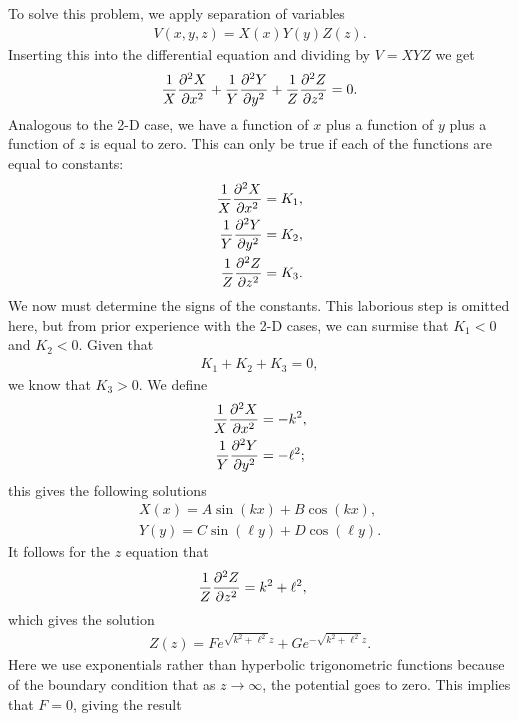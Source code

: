 To solve this problem, we apply separation of variables
\begin{align}
  V(x,y,z) = X(x) Y(y) Z(z) .
\end{align}
Inserting this into the differential equation and dividing by $V = XYZ$ we get
\begin{align}
  \frac{1}{X} \frac{ \partial^2 {X} }{ \partial {x}^2 } + \frac{1}{Y} \frac{ \partial^2 {Y} }{ \partial {y}^2 } + \frac{1}{Z} \frac{ \partial^2 {Z} }{ \partial {z}^2 } = 0.
\end{align}
Analogous to the 2-D case, we have a function of $x$ plus a function of $y$ plus a function of $z$ is equal to zero. This can only be true if each of the functions are equal to constants:
\begin{subequations}
\begin{align}
  \frac{1}{X} \frac{ \partial^2 {X} }{ \partial {x}^2 } &= K_1, \\
  \frac{1}{Y} \frac{ \partial^2 {Y} }{ \partial {y}^2 } &= K_2, \\
  \frac{1}{Z} \frac{ \partial^2 {Z} }{ \partial {z}^2 } &= K_3.  
\end{align}
\end{subequations}
We now must determine the signs of the constants. This laborious step is omitted here, but from prior experience with the 2-D cases, we can surmise that $K_1 < 0$ and $K_2 < 0$. Given that
\begin{align}
  K_1 + K_2 + K_3 = 0, \nonumber
\end{align}
we know that $K_3 > 0$. We define
\begin{subequations}
\begin{align}
  \frac{1}{X} \frac{ \partial^2 {X} }{ \partial {x}^2 } &= -k^2, \\
  \frac{1}{Y} \frac{ \partial^2 {Y} }{ \partial {y}^2 } &= -\ell^2 ; 
\end{align}
\end{subequations}
this gives the following solutions
\begin{subequations}
\begin{align}
  X(x) = A \sin( k x ) + B \cos ( k x ), \\
  Y(y) = C \sin( \ell y ) + D \cos ( \ell y ) .
\end{align}
\end{subequations}
It follows for the $z$ equation that
\begin{align}
  \frac{1}{Z} \frac{ \partial^2 {Z} }{ \partial {z}^2 } &= k^2 + \ell^2 ,
\end{align}
which gives the solution
\begin{align}
  Z(z) = F e^{\sqrt{ k^2 + \ell^2 } z} + G e^{-\sqrt{ k^2 + \ell^2 } z} . 
\end{align}
Here we use exponentials rather than hyperbolic trigonometric functions because of the boundary condition that as $z \rightarrow \infty$, the potential goes to zero. This implies that $F = 0$, giving the result
